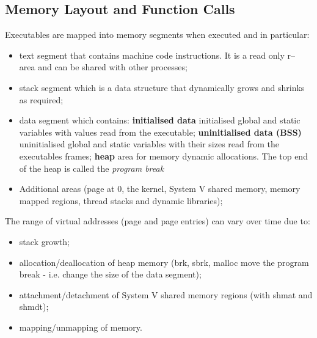 \subsection{Memory Layout and Function Calls}
Executables are mapped into memory segments when executed and in particular:
\begin{itemize}
    \item {\ttfamily text} segment that contains machine code instructions. It is a read only {\ttfamily r--} area and
        can be shared with other processes;
    \item {\ttfamily stack} segment which is a data structure that dynamically grows and shrinks as required;
    \item {\ttfamily data} segment which contains:
        \subitem \textbf{initialised data} initialised global and static variables with values read from the executable;
        \subitem \textbf{uninitialised data (BSS)} uninitialised global and static variables with their sizes read from
        the executables frames;
        \subitem \textbf{heap} area for memory dynamic allocations. The top end of the heap is called the
        \textit{program break}
    \item Additional areas (page at 0, the kernel, System V shared memory, memory mapped regions, thread stacks and
        dynamic libraries);
\end{itemize}
The range of virtual addresses (page and page entries) can vary over time due to:
\begin{itemize}
    \item stack growth;
    \item allocation/deallocation of heap memory ({\ttfamily brk, sbrk, malloc} move the program break - i.e. change the
        size of the data segment);
    \item attachment/detachment of System V shared memory regions (with {\ttfamily shmat} and {\ttfamily shmdt});
    \item mapping/unmapping of memory.
\end{itemize}

